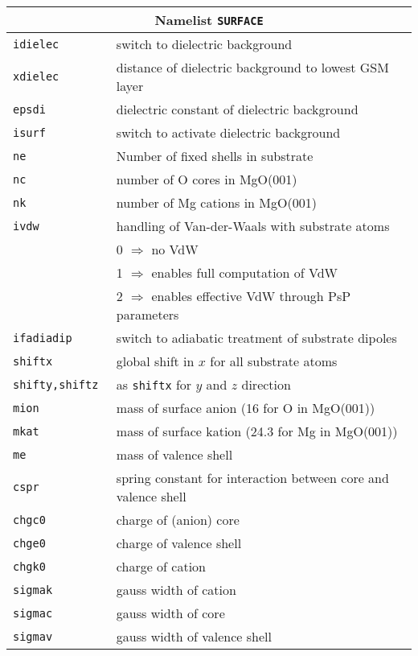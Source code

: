\documentclass[12pt]{article}
\begin{document}
\begin{tabular}{ll}
\hline
\multicolumn{2}{c}{Namelist {\tt SURFACE}} in {\tt for005.<name>} \\
\hline
{\tt idielec } & switch to dielectric background  \\
{\tt xdielec } & distance of dielectric background to lowest GSM layer \\
{\tt epsdi } & dielectric constant of  dielectric background \\
{\tt isurf } & switch to activate  dielectric background  \\
\hline
{\tt ne               }& Number of fixed shells in substrate\\
{\tt nc               }& number of O cores in MgO(001)\\
{\tt nk               }& number of Mg cations in MgO(001)\\
{\tt ivdw} & handling of Van-der-Waals with substrate atoms\\
    & 0 $\Longrightarrow$ no VdW\\
    & 1 $\Longrightarrow$ enables full computation of VdW\\
    & 2 $\Longrightarrow$ enables effective VdW through PsP parameters\\
{\tt ifadiadip        }& switch to adiabatic treatment of substrate dipoles\\
{\tt shiftx           }& global shift in $x$ for all substrate atoms\\
{\tt shifty,shiftz    }& as {\tt shiftx} for $y$ and $z$ direction\\
{\tt mion             }& mass of surface anion (16 for O in MgO(001))\\
{\tt mkat             }& mass of surface kation (24.3 for Mg in MgO(001))\\
{\tt me               }& mass of valence shell\\
{\tt cspr             }& spring constant for interaction between core and valence shell\\
{\tt chgc0            }& charge of (anion) core\\
{\tt chge0            }& charge of valence shell\\
{\tt chgk0            }& charge of cation\\
{\tt sigmak           }& gauss width of cation\\
{\tt sigmac           }& gauss width of core\\
{\tt sigmav           }& gauss width of valence shell\\

\end{tabular}
\end{document}
